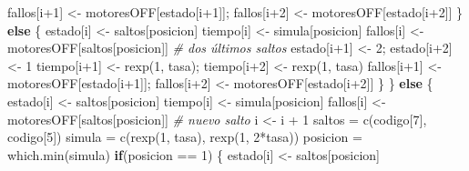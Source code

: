 \documentclass[
]{book}
\newenvironment{Shaded}{\begin{snugshade}}{\end{snugshade}}
\newcommand{\CommentTok}[1]{\textcolor[rgb]{0.56,0.35,0.01}{\textit{#1}}}
\newcommand{\ControlFlowTok}[1]{\textcolor[rgb]{0.13,0.29,0.53}{\textbf{#1}}}
\newcommand{\DecValTok}[1]{\textcolor[rgb]{0.00,0.00,0.81}{#1}}
\newcommand{\FunctionTok}[1]{\textcolor[rgb]{0.00,0.00,0.00}{#1}}
\newcommand{\NormalTok}[1]{#1}
\newcommand{\OtherTok}[1]{\textcolor[rgb]{0.56,0.35,0.01}{#1}}
\newcommand{\SpecialCharTok}[1]{\textcolor[rgb]{0.00,0.00,0.00}{#1}}
\theoremstyle{definition}
\theoremstyle{definition}
\theoremstyle{definition}
\theoremstyle{definition}
\theoremstyle{remark}
\begin{document}
\begin{Shaded}
\begin{Highlighting}[]
\NormalTok{      fallos[i}\SpecialCharTok{+}\DecValTok{1}\NormalTok{] }\OtherTok{\textless{}{-}}\NormalTok{ motoresOFF[estado[i}\SpecialCharTok{+}\DecValTok{1}\NormalTok{]]; fallos[i}\SpecialCharTok{+}\DecValTok{2}\NormalTok{] }\OtherTok{\textless{}{-}}\NormalTok{ motoresOFF[estado[i}\SpecialCharTok{+}\DecValTok{2}\NormalTok{]]}
\NormalTok{    \}}
    \ControlFlowTok{else}
\NormalTok{    \{}
\NormalTok{      estado[i] }\OtherTok{\textless{}{-}}\NormalTok{ saltos[posicion]}
\NormalTok{      tiempo[i] }\OtherTok{\textless{}{-}}\NormalTok{ simula[posicion] }
\NormalTok{      fallos[i] }\OtherTok{\textless{}{-}}\NormalTok{ motoresOFF[saltos[posicion]]  }
      \CommentTok{\# dos últimos saltos}
\NormalTok{      estado[i}\SpecialCharTok{+}\DecValTok{1}\NormalTok{] }\OtherTok{\textless{}{-}} \DecValTok{2}\NormalTok{; estado[i}\SpecialCharTok{+}\DecValTok{2}\NormalTok{] }\OtherTok{\textless{}{-}} \DecValTok{1}
\NormalTok{      tiempo[i}\SpecialCharTok{+}\DecValTok{1}\NormalTok{] }\OtherTok{\textless{}{-}} \FunctionTok{rexp}\NormalTok{(}\DecValTok{1}\NormalTok{, tasa); tiempo[i}\SpecialCharTok{+}\DecValTok{2}\NormalTok{] }\OtherTok{\textless{}{-}} \FunctionTok{rexp}\NormalTok{(}\DecValTok{1}\NormalTok{, tasa)}
\NormalTok{      fallos[i}\SpecialCharTok{+}\DecValTok{1}\NormalTok{] }\OtherTok{\textless{}{-}}\NormalTok{ motoresOFF[estado[i}\SpecialCharTok{+}\DecValTok{1}\NormalTok{]]; fallos[i}\SpecialCharTok{+}\DecValTok{2}\NormalTok{] }\OtherTok{\textless{}{-}}\NormalTok{ motoresOFF[estado[i}\SpecialCharTok{+}\DecValTok{2}\NormalTok{]]}
\NormalTok{    \}}
\NormalTok{  \}}
  \ControlFlowTok{else}
\NormalTok{  \{}
\NormalTok{    estado[i] }\OtherTok{\textless{}{-}}\NormalTok{ saltos[posicion]}
\NormalTok{    tiempo[i] }\OtherTok{\textless{}{-}}\NormalTok{ simula[posicion] }
\NormalTok{    fallos[i] }\OtherTok{\textless{}{-}}\NormalTok{ motoresOFF[saltos[posicion]]}
    \CommentTok{\# nuevo salto}
\NormalTok{    i }\OtherTok{\textless{}{-}}\NormalTok{ i }\SpecialCharTok{+} \DecValTok{1}
\NormalTok{    saltos }\OtherTok{=} \FunctionTok{c}\NormalTok{(codigo[}\DecValTok{7}\NormalTok{], codigo[}\DecValTok{5}\NormalTok{])}
\NormalTok{    simula }\OtherTok{=} \FunctionTok{c}\NormalTok{(}\FunctionTok{rexp}\NormalTok{(}\DecValTok{1}\NormalTok{, tasa), }\FunctionTok{rexp}\NormalTok{(}\DecValTok{1}\NormalTok{, }\DecValTok{2}\SpecialCharTok{*}\NormalTok{tasa))}
\NormalTok{    posicion }\OtherTok{=} \FunctionTok{which.min}\NormalTok{(simula)}
    \ControlFlowTok{if}\NormalTok{(posicion }\SpecialCharTok{==} \DecValTok{1}\NormalTok{)}
\NormalTok{    \{}
\NormalTok{      estado[i] }\OtherTok{\textless{}{-}}\NormalTok{ saltos[posicion]}

\end{Highlighting}
\end{Shaded}
\end{document}

